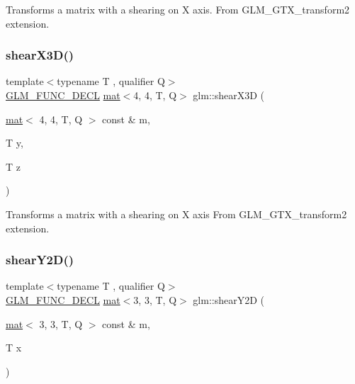 Transforms a matrix with a shearing on X axis. From G\+L\+M\+\_\+\+G\+T\+X\+\_\+transform2 extension. \mbox{\label{group__gtx__transform2_ga73e867c6cd4d700fe2054437e56106c4}} 
\subsubsection{\texorpdfstring{shear\+X3\+D()}{shearX3D()}}
{\footnotesize\ttfamily template$<$typename T , qualifier Q$>$ \\
\mbox{\hyperlink{setup_8hpp_ab2d052de21a70539923e9bcbf6e83a51}{G\+L\+M\+\_\+\+F\+U\+N\+C\+\_\+\+D\+E\+CL}} \mbox{\hyperlink{structglm_1_1mat}{mat}}$<$4, 4, T, Q$>$ glm\+::shear\+X3D (\begin{DoxyParamCaption}\item[{\mbox{\hyperlink{structglm_1_1mat}{mat}}$<$ 4, 4, T, Q $>$ const \&}]{m,  }\item[{T}]{y,  }\item[{T}]{z }\end{DoxyParamCaption})}

Transforms a matrix with a shearing on X axis From G\+L\+M\+\_\+\+G\+T\+X\+\_\+transform2 extension. \mbox{\label{group__gtx__transform2_gac7998d0763d9181550c77e8af09a182c}} 
\subsubsection{\texorpdfstring{shear\+Y2\+D()}{shearY2D()}}
{\footnotesize\ttfamily template$<$typename T , qualifier Q$>$ \\
\mbox{\hyperlink{setup_8hpp_ab2d052de21a70539923e9bcbf6e83a51}{G\+L\+M\+\_\+\+F\+U\+N\+C\+\_\+\+D\+E\+CL}} \mbox{\hyperlink{structglm_1_1mat}{mat}}$<$3, 3, T, Q$>$ glm\+::shear\+Y2D (\begin{DoxyParamCaption}\item[{\mbox{\hyperlink{structglm_1_1mat}{mat}}$<$ 3, 3, T, Q $>$ const \&}]{m,  }\item[{T}]{x }\end{DoxyParamCaption})}

